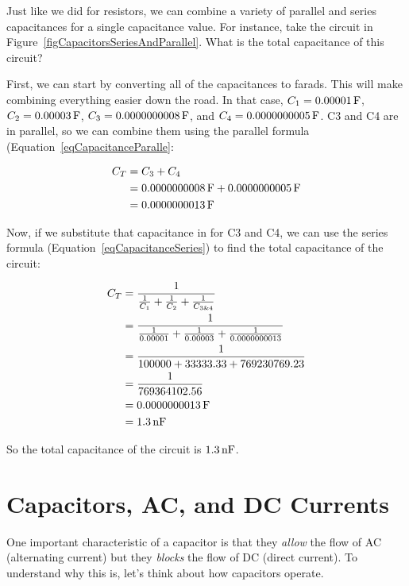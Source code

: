 \begin{exampleprob}
Just like we did for resistors, we can combine a variety of parallel and series capacitances for a single capacitance value.  For instance, take the circuit in Figure~\ref{figCapacitorsSeriesAndParallel}.  What is the total capacitance of this circuit?


First, we can start by converting all of the capacitances to farads.
This will make combining everything easier down the road.
In that case, $C_1 = 0.00001\,\si{\farad}$, $C_2 = 0.00003\,\si{\farad}$, $C_3 = 0.0000000008\,\si{\farad}$, and $C_4 = 0.0000000005\,\si{\farad}$.
C3 and C4 are in parallel, so we can combine them using the parallel formula (Equation~\ref{eqCapacitanceParalle}:

\begin{align*}
C_T &= C_3 + C_4 \\
    &= 0.0000000008\,\si{\farad} + 0.0000000005\,\si{\farad} \\
    &= 0.0000000013\,\si{\farad}
\end{align*}

Now, if we substitute that capacitance in for C3 and C4, we can use the series formula (Equation~\ref{eqCapacitanceSeries}) to find the total capacitance of the circuit:

\begin{align*}
C_T &= \frac{1}{\frac{1}{C_1} + \frac{1}{C_2} + \frac{1}{C_{3\&4}}} \\
    &= \frac{1}{\frac{1}{0.00001} + \frac{1}{0.00003} + \frac{1}{0.0000000013}} \\
    &= \frac{1}{100000 + 33333.33 + 769230769.23} \\
    &= \frac{1}{769364102.56} \\
    &= 0.0000000013\,\si{\farad} \\
    &= 1.3\,\si{\nano\farad} 
\end{align*}

So the total capacitance of the circuit is $1.3\,\si{\nano\farad}$.
\end{exampleprob}

\section{Capacitors, AC, and DC Currents}

One important characteristic of a capacitor is that they \emph{allow} the flow of AC (alternating current) but they \emph{blocks} the flow of DC (direct current).
To understand why this is, let's think about how capacitors operate.

